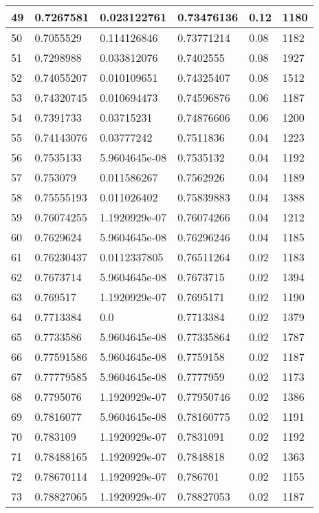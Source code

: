 \begin{longtable}{|l|l|l|l|l|l|}
49 & 0.7267581 & 0.023122761 & 0.73476136 & 0.12 & 1180 \\ \hline 
50 & 0.7055529 & 0.114126846 & 0.73771214 & 0.08 & 1182 \\ \hline 
51 & 0.7298988 & 0.033812076 & 0.7402555 & 0.08 & 1927 \\ \hline 
52 & 0.74055207 & 0.010109651 & 0.74325407 & 0.08 & 1512 \\ \hline 
53 & 0.74320745 & 0.010694473 & 0.74596876 & 0.06 & 1187 \\ \hline 
54 & 0.7391733 & 0.03715231 & 0.74876606 & 0.06 & 1200 \\ \hline 
55 & 0.74143076 & 0.03777242 & 0.7511836 & 0.04 & 1223 \\ \hline 
56 & 0.7535133 & 5.9604645e-08 & 0.7535132 & 0.04 & 1192 \\ \hline 
57 & 0.753079 & 0.011586267 & 0.7562926 & 0.04 & 1189 \\ \hline 
58 & 0.75555193 & 0.011026402 & 0.75839883 & 0.04 & 1388 \\ \hline 
59 & 0.76074255 & 1.1920929e-07 & 0.76074266 & 0.04 & 1212 \\ \hline 
60 & 0.7629624 & 5.9604645e-08 & 0.76296246 & 0.04 & 1185 \\ \hline 
61 & 0.76230437 & 0.0112337805 & 0.76511264 & 0.02 & 1183 \\ \hline 
62 & 0.7673714 & 5.9604645e-08 & 0.7673715 & 0.02 & 1394 \\ \hline 
63 & 0.769517 & 1.1920929e-07 & 0.7695171 & 0.02 & 1190 \\ \hline 
64 & 0.7713384 & 0.0 & 0.7713384 & 0.02 & 1379 \\ \hline 
65 & 0.7733586 & 5.9604645e-08 & 0.77335864 & 0.02 & 1787 \\ \hline 
66 & 0.77591586 & 5.9604645e-08 & 0.7759158 & 0.02 & 1187 \\ \hline 
67 & 0.77779585 & 5.9604645e-08 & 0.7777959 & 0.02 & 1173 \\ \hline 
68 & 0.7795076 & 1.1920929e-07 & 0.77950746 & 0.02 & 1386 \\ \hline 
69 & 0.7816077 & 5.9604645e-08 & 0.78160775 & 0.02 & 1191 \\ \hline 
70 & 0.783109 & 1.1920929e-07 & 0.7831091 & 0.02 & 1192 \\ \hline 
71 & 0.78488165 & 1.1920929e-07 & 0.7848818 & 0.02 & 1363 \\ \hline 
72 & 0.78670114 & 1.1920929e-07 & 0.786701 & 0.02 & 1155 \\ \hline 
73 & 0.78827065 & 1.1920929e-07 & 0.78827053 & 0.02 & 1187 \\ \hline 

\end{longtable}
